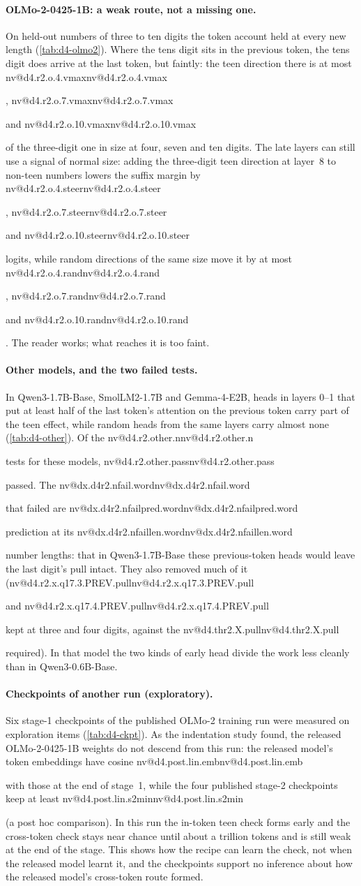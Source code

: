 \documentclass[11pt]{article}
\makeatletter
\newcommand{\nv}[1]{\ifcsname nv@#1\endcsname\csname nv@#1\endcsname\else\PackageError{numbers}{Unknown number key #1}{}\fi}
\newcommand{\qsix}{Qwen3-0.6B-Base}
\newcommand{\qbig}{Qwen3-1.7B-Base}
\newcommand{\olmo}{OLMo-2-0425-1B}
\newcommand{\gm}{Gemma-4-E2B}
\makeatother
\begin{document}
\paragraph{\olmo{}: a weak route, not a missing one.} On held-out numbers of three to ten digits the token account held at every new length (\cref{tab:d4-olmo2}). Where the tens digit sits in the previous token, the tens digit does arrive at the last token, but faintly: the teen direction there is at most \nv{d4.r2.o.4.vmax}, \nv{d4.r2.o.7.vmax} and \nv{d4.r2.o.10.vmax} of the three-digit one in size at four, seven and ten digits. The late layers can still use a signal of normal size: adding the three-digit teen direction at layer~8 to non-teen numbers lowers the suffix margin by \nv{d4.r2.o.4.steer}, \nv{d4.r2.o.7.steer} and \nv{d4.r2.o.10.steer} logits, while random directions of the same size move it by at most \nv{d4.r2.o.4.rand}, \nv{d4.r2.o.7.rand} and \nv{d4.r2.o.10.rand}. The reader works; what reaches it is too faint.

\paragraph{Other models, and the two failed tests.} In \qbig{}, SmolLM2-1.7B and \gm{}, heads in layers 0--1 that put at least half of the last token's attention on the previous token carry part of the teen effect, while random heads from the same layers carry almost none (\cref{tab:d4-other}). Of the \nv{d4.r2.other.n} tests for these models, \nv{d4.r2.other.pass} passed. The \nv{dx.d4r2.nfail.word} that failed are \nv{dx.d4r2.nfailpred.word} prediction at its \nv{dx.d4r2.nfaillen.word} number lengths: that in \qbig{} these previous-token heads would leave the last digit's pull intact. They also removed much of it (\nv{d4.r2.x.q17.3.PREV.pull} and \nv{d4.r2.x.q17.4.PREV.pull} kept at three and four digits, against the \nv{d4.thr2.X.pull} required). In that model the two kinds of early head divide the work less cleanly than in \qsix{}.

\paragraph{Checkpoints of another run (exploratory).} Six stage-1 checkpoints of the published OLMo-2 training run were measured on exploration items (\cref{tab:d4-ckpt}). As the indentation study found, the released \olmo{} weights do not descend from this run: the released model's token embeddings have cosine \nv{d4.post.lin.emb} with those at the end of stage~1, while the four published stage-2 checkpoints keep at least \nv{d4.post.lin.s2min} (a post hoc comparison). In this run the in-token teen check forms early and the cross-token check stays near chance until about a trillion tokens and is still weak at the end of the stage. This shows how the recipe can learn the check, not when the released model learnt it, and the checkpoints support no inference about how the released model's cross-token route formed.
\end{document}
